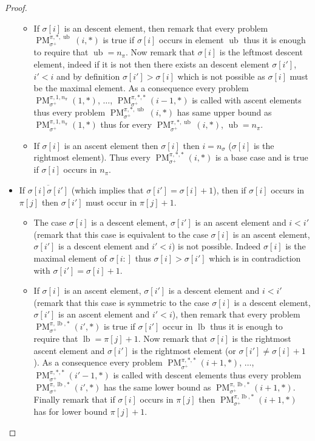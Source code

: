 \documentclass[a4paper]{llncs}
\newcommand{\ptext}{\pi}
\newcommand{\pmotif}{\sigma}
\newcommand{\pbmotif}{\pmotif^+}
\DeclareMathOperator{\PMa}{PM}
\newcommand{\PM}[6]{\PMa_{{#1}}^{{#2},{#3},{#4}}({#5},{#6})}
\DeclareMathOperator{\lb}{lb}
\DeclareMathOperator{\ub}{ub}
\begin{document}
\begin{proof}
\begin{itemize}
\begin{itemize}
		\item If $\sigma[i]$ is an descent element, then remark that 
		every problem 
		$\PM{\pbmotif}{\ptext}{*}{\ub}{i}{*}$ is true if $\sigma[i]$ occurs 
		in element $\ub$ thus it is enough to require that $\ub=n_{\ptext}$.
		Now remark that $\sigma[i]$ is the leftmost descent element, indeed if it is not
		then there exists an descent element $\sigma[i']$, $i'<i$ and by definition 
		$\sigma[i']>\sigma[i]$ which is not possible as $\sigma[i]$ must be the maximal
		element. 
		As a consequence every problem 
		$\PM{\pbmotif}{\ptext}{1}{n_{\ptext}}{1}{*}$, $\dots$, 
		$\PM{\pbmotif}{\ptext}{*}{*}{i-1}{*}$ 
		is called with ascent elements thus every problem 
		$\PM{\pbmotif}{\ptext}{*}{\ub}{i}{*}$ 
		has same upper bound as $\PM{\pbmotif}{\ptext}{1}{n_{\ptext}}{1}{*}$ 
		thus for every $\PM{\pbmotif}{\ptext}{*}{\ub}{i}{*}$,
		$\ub=n_{\ptext}$.	
		
		
		\item If $\sigma[i]$ is an ascent element then $\sigma[i]$ then $i=n_\pmotif$ ($\sigma[i]$ is the rightmost element). Thus every $\PM{\pbmotif}{\ptext}{*}{*}{i}{*}$ is a base case and is true if $\sigma[i]$ occurs in $n_{\ptext}$.

	\end{itemize}

	\item  If $\overline{\pmotif[i]\pmotif[i']}$
	(which implies that $\pmotif[i']=\pmotif[i]+1$), 
	then if $\pmotif[i]$ occurs in $\ptext[j]$ 
	then $\pmotif[i']$ must occur in $\ptext[j]+1$.
		\begin{itemize}

			\item The case $\pmotif[i]$ is a descent element, $\pmotif[i']$ is an ascent element and $i<i'$ (remark that this case is equivalent to the case $\pmotif[i]$ is an ascent element, $\pmotif[i']$ is a descent element and $i'<i$) is not possible. 
			Indeed $\pmotif[i]$ is the maximal element of $\pmotif[i:]$ thus $\pmotif[i] > \pmotif[i']$ which is in contradiction with 
			$\pmotif[i']=\pmotif[i]+1$. 
			
			\item If $\pmotif[i]$ is an ascent element, $\pmotif[i']$ is a descent element 
			and $i<i'$ (remark that this case is symmetric to the case $\pmotif[i]$ 
			is a descent element, $\pmotif[i']$ is an ascent element and $i'<i$), then
			remark that every problem 
			$\PM{\pbmotif}{\ptext}{\lb}{*}{i'}{*}$ is true if $\sigma[i']$ occur in $\lb$ thus it is enough to require that $\lb=\ptext[j]+1$.
			Now remark that
			$\pmotif[i]$ is the rightmost ascent element and $\pmotif[i']$ is the rightmost element (or $\pmotif[i'] \neq \pmotif[i]+1$). 
			As a consequence every problem 
			$\PM{\pbmotif}{\ptext}{*}{*}{i+1}{*}$, $\dots$, $\PM{\pbmotif}{\ptext}{*}{*}{i'-1}{*}$ 
			is called with descent elements
			thus every problem 
			$\PM{\pbmotif}{\ptext}{\lb}{*}{i'}{*}$ 
			has the same lower bound as $\PM{\pbmotif}{\ptext}{\lb}{*}{i+1}{*}$.
			Finally remark that if $\pmotif[i]$ occurs in $\ptext[j]$ then  
			$\PM{\pbmotif}{\ptext}{\lb}{*}{i+1}{*}$ has for lower bound $\ptext[j]+1$.
			

\end{itemize}
\end{itemize}
\end{proof}
\end{document}
